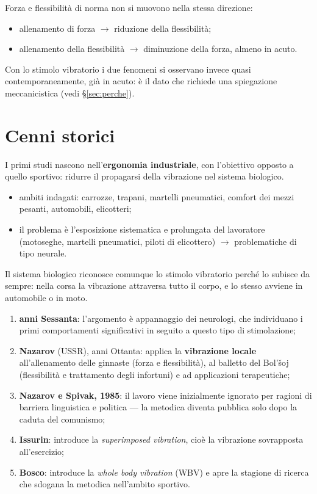 Forza e flessibilità di norma non si muovono nella stessa direzione:
\begin{itemize}
  \item allenamento di forza $\rightarrow$ riduzione della flessibilità;
  \item allenamento della flessibilità $\rightarrow$ diminuzione della forza, almeno in acuto.
\end{itemize}
Con lo stimolo vibratorio i due fenomeni si osservano invece quasi contemporaneamente, già in acuto:
è il dato che richiede una spiegazione meccanicistica (vedi §\ref{sec:perche}).

\section{Cenni storici}

I primi studi nascono nell'\textbf{ergonomia industriale}, con l'obiettivo opposto a quello
sportivo: ridurre il propagarsi della vibrazione nel sistema biologico.
\begin{itemize}
  \item ambiti indagati: carrozze, trapani, martelli pneumatici, comfort dei mezzi pesanti,
    automobili, elicotteri;
  \item il problema è l'esposizione sistematica e prolungata del lavoratore (motoseghe, martelli
    pneumatici, piloti di elicottero) $\rightarrow$ problematiche di tipo neurale.
\end{itemize}
Il sistema biologico riconosce comunque lo stimolo vibratorio perché lo subisce da sempre: nella
corsa la vibrazione attraversa tutto il corpo, e lo stesso avviene in automobile o in moto.

\begin{enumerate}
  \item \textbf{anni Sessanta}: l'argomento è appannaggio dei neurologi, che individuano i primi
    comportamenti significativi in seguito a questo tipo di stimolazione;
  \item \textbf{Nazarov} (USSR), anni Ottanta: applica la \textbf{vibrazione locale} all'allenamento
    delle ginnaste (forza e flessibilità), al balletto del Bol'šoj (flessibilità e trattamento degli
    infortuni) e ad applicazioni terapeutiche;
  \item \textbf{Nazarov e Spivak, 1985}: il lavoro viene inizialmente ignorato per ragioni di
    barriera linguistica e politica --- la metodica diventa pubblica solo dopo la caduta del
    comunismo;
  \item \textbf{Issurin}: introduce la \textit{superimposed vibration}, cioè la vibrazione
    sovrapposta all'esercizio;
  \item \textbf{Bosco}: introduce la \textit{whole body vibration} (WBV) e apre la stagione di
    ricerca che sdogana la metodica nell'ambito sportivo.
\end{enumerate}

